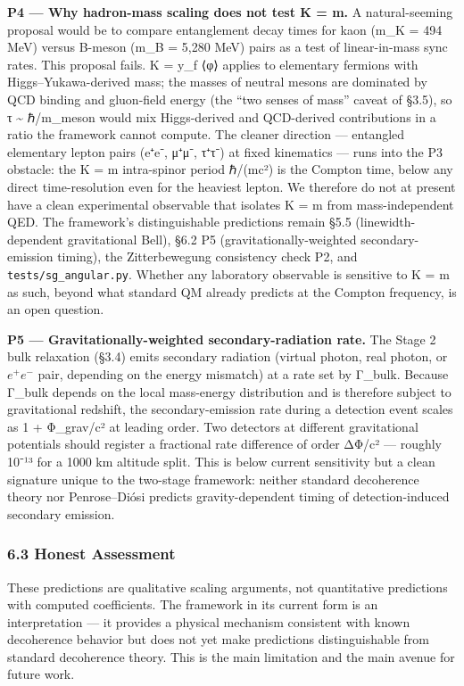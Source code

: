 \documentclass[
]{article}
\begin{document}
\textbf{P4 --- Why hadron-mass scaling does not test K = m.} A
natural-seeming proposal would be to compare entanglement decay times
for kaon (m\_K = 494 MeV) versus B-meson (m\_B = 5,280 MeV) pairs as a
test of linear-in-mass sync rates. This proposal fails. K = y\_f ⟨φ⟩
applies to elementary fermions with Higgs--Yukawa-derived mass; the
masses of neutral mesons are dominated by QCD binding and gluon-field
energy (the ``two senses of mass'' caveat of §3.5), so τ
\textasciitilde{} ℏ/m\_meson would mix Higgs-derived and QCD-derived
contributions in a ratio the framework cannot compute. The cleaner
direction --- entangled elementary lepton pairs (e⁺e⁻, μ⁺μ⁻, τ⁺τ⁻) at
fixed kinematics --- runs into the P3 obstacle: the K = m intra-spinor
period ℏ/(mc²) is the Compton time, below any direct time-resolution
even for the heaviest lepton. We therefore do not at present have a
clean experimental observable that isolates K = m from mass-independent
QED. The framework's distinguishable predictions remain §5.5
(linewidth-dependent gravitational Bell), §6.2 P5
(gravitationally-weighted secondary-emission timing), the Zitterbewegung
consistency check P2, and \texttt{tests/sg\_angular.py}. Whether any
laboratory observable is sensitive to K = m as such, beyond what
standard QM already predicts at the Compton frequency, is an open
question.

\textbf{P5 --- Gravitationally-weighted secondary-radiation rate.} The
Stage 2 bulk relaxation (§3.4) emits secondary radiation (virtual
photon, real photon, or \(e^+ e^-\) pair, depending on the energy
mismatch) at a rate set by Γ\_bulk. Because Γ\_bulk depends on the local
mass-energy distribution and is therefore subject to gravitational
redshift, the secondary-emission rate during a detection event scales as
1 + Φ\_grav/c² at leading order. Two detectors at different
gravitational potentials should register a fractional rate difference of
order ΔΦ/c² --- roughly 10⁻¹³ for a 1000 km altitude split. This is
below current sensitivity but a clean signature unique to the two-stage
framework: neither standard decoherence theory nor Penrose--Diósi
predicts gravity-dependent timing of detection-induced secondary
emission.

\subsubsection{6.3 Honest Assessment}\label{honest-assessment}

These predictions are qualitative scaling arguments, not quantitative
predictions with computed coefficients. The framework in its current
form is an interpretation --- it provides a physical mechanism
consistent with known decoherence behavior but does not yet make
predictions distinguishable from standard decoherence theory. This is
the main limitation and the main avenue for future work.
\end{document}
